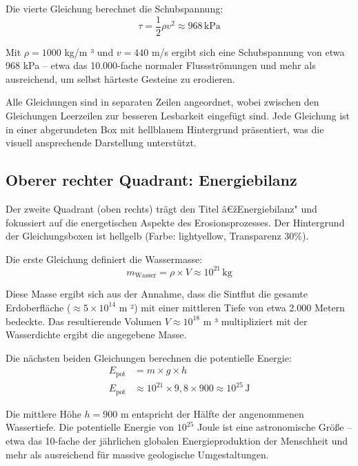 ﻿\documentclass[12pt,a4paper]{report}
\begin{document}
Die vierte Gleichung berechnet die Schubspannung:
\begin{equation*}
	\tau = \frac{1}{2} \rho v^2 \approx 968 \, \mathrm{kPa}
\end{equation*}

Mit $\rho = 1000$ kg/m ³ und $v = 440$ m/s ergibt sich eine Schubspannung von etwa 968 kPa -- etwa das 10.000-fache normaler Flussströmungen und mehr als ausreichend, um selbst härteste Gesteine zu erodieren.

Alle Gleichungen sind in separaten Zeilen angeordnet, wobei zwischen den Gleichungen Leerzeilen zur besseren Lesbarkeit eingefügt sind. Jede Gleichung ist in einer abgerundeten Box mit hellblauem Hintergrund präsentiert, was die visuell ansprechende Darstellung unterstützt.

\subsection{Oberer rechter Quadrant: Energiebilanz}

Der zweite Quadrant (oben rechts) trägt den Titel â€žEnergiebilanz" und fokussiert auf die energetischen Aspekte des Erosionsprozesses. Der Hintergrund der Gleichungsboxen ist hellgelb (Farbe: lightyellow, Transparenz 30\%).

Die erste Gleichung definiert die Wassermasse:
\begin{equation*}
	m_{\mathrm{Wasser}} = \rho \times V \approx 10^{21} \, \mathrm{kg}
\end{equation*}

Diese Masse ergibt sich aus der Annahme, dass die Sintflut die gesamte Erdoberfläche ($\approx 5 \times 10^{14}$ m ²) mit einer mittleren Tiefe von etwa 2.000 Metern bedeckte. Das resultierende Volumen $V \approx 10^{18}$ m ³ multipliziert mit der Wasserdichte ergibt die angegebene Masse.

Die nächsten beiden Gleichungen berechnen die potentielle Energie:
\begin{align*}
	E_{\mathrm{pot}} &= m \times g \times h \\
	E_{\mathrm{pot}} &\approx 10^{21} \times 9{,}8 \times 900 \approx 10^{25} \, \mathrm{J}
\end{align*}

Die mittlere Höhe $h = 900$ m entspricht der Hälfte der angenommenen Wassertiefe. Die potentielle Energie von $10^{25}$ Joule ist eine astronomische Größe -- etwa das 10-fache der jährlichen globalen Energieproduktion der Menschheit und mehr als ausreichend für massive geologische Umgestaltungen.
\end{document}

